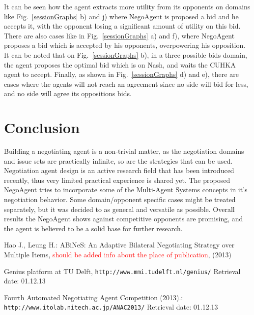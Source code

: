 \documentclass[html]{report}    %
\begin{document}
It can be seen how the agent extracts more utility from its opponents on domains like Fig.~\ref{sessionGraphs} b) and j) where NegoAgent is proposed a bid and he accepts it, with the opponent losing a significant amount of utility on this bid. There are also cases like in Fig.~\ref{sessionGraphs} a) and f), where NegoAgent proposes a bid which is accepted by his opponents, overpowering his opposition. It can be noted that on Fig.~\ref{sessionGraphs} b), in a three possible bids domain, the agent proposes the optimal bid which is on Nash, and waits the CUHKA agent to accept. Finally, as shown in Fig.~\ref{sessionGraphs} d) and e), there are cases where the agents will not reach an agreement since no side will bid for less, and no side will agree its oppositions bids.


\section{Conclusion}
Building a negotiating agent is a non-trivial matter, as the negotiation domains and issue sets are practically infinite, so are the strategies that can be used. Negotiation agent design is an active research field that has been introduced recently, thus very limited practical experience is shared yet. The proposed NegoAgent tries to incorporate some of the Multi-Agent Systems concepts in it's negotiation behavior. Some domain/opponent specific cases might be treated separately, but it was decided to as general and versatile as possible. Overall results the NegoAgent shows against competitive opponents are promising, and the agent is believed to be a solid base for further research. 

\begin{thebibliography}{}

Hao J., Leung H.:
ABiNeS: An Adaptive Bilateral Negotiating Strategy over Multiple Items,
\textcolor{red}{should be added info about the place of publication}, (2013)

Genius platform at TU Delft,
\texttt{http://www.mmi.tudelft.nl/genius/} Retrieval date: 01.12.13

Fourth Automated Negotiating Agent Competition (2013).:
\texttt{http://www.itolab.nitech.ac.jp/ANAC2013/} Retrieval date: 01.12.13

\end{thebibliography}
\end{document}
